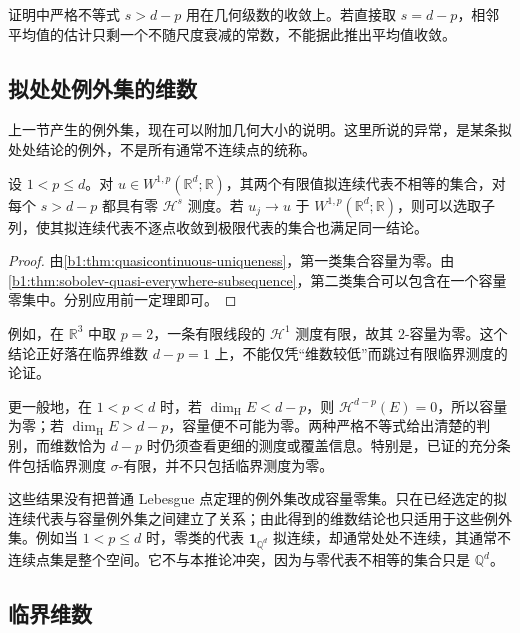 证明中严格不等式 \(s>d-p\) 用在几何级数的收敛上。若直接取 \(s=d-p\)，相邻平均值的估计只剩一个不随尺度衰减的常数，不能据此推出平均值收敛。

\subsection{拟处处例外集的维数}
\label{b1:subsec:260303}

上一节产生的例外集，现在可以附加几何大小的说明。这里所说的异常，是某条拟处处结论的例外，不是所有通常不连续点的统称。

\begin{corollary}\label{b1:cor:capacity-exception-dimension}
设 \(1<p\leq d\)。对 \(u\in W^{1,p}(\mathbb R^d;\mathbb R)\)，其两个有限值拟连续代表不相等的集合，对每个 \(s>d-p\) 都具有零 \(\mathcal H^s\) 测度。若 \(u_j\to u\) 于 \(W^{1,p}(\mathbb R^d;\mathbb R)\)，则可以选取子列，使其拟连续代表不逐点收敛到极限代表的集合也满足同一结论。
\end{corollary}
\begin{proof}
由\cref{b1:thm:quasicontinuous-uniqueness}，第一类集合容量为零。由\cref{b1:thm:sobolev-quasi-everywhere-subsequence}，第二类集合可以包含在一个容量零集中。分别应用前一定理即可。
\end{proof}

例如，在 \(\mathbb R^3\) 中取 \(p=2\)，一条有限线段的
\(\mathcal H^1\) 测度有限，故其 \(2\)-容量为零。这个结论正好落在临界维数 \(d-p=1\) 上，不能仅凭“维数较低”而跳过有限临界测度的论证。

\ProseParagraphBreak

更一般地，在 \(1<p<d\) 时，若
\(\dim_{\mathrm H}E<d-p\)，则 \(\mathcal H^{d-p}(E)=0\)，所以容量为零；若
\(\dim_{\mathrm H}E>d-p\)，容量便不可能为零。两种严格不等式给出清楚的判别，而维数恰为 \(d-p\) 时仍须查看更细的测度或覆盖信息。特别是，已证的充分条件包括临界测度 \(\sigma\)-有限，并不只包括临界测度为零。

\ProseParagraphBreak

这些结果没有把普通 Lebesgue 点定理的例外集改成容量零集。只在已经选定的拟连续代表与容量例外集之间建立了关系；由此得到的维数结论也只适用于这些例外集。例如当 \(1<p\leq d\) 时，零类的代表 \(\mathbf1_{\mathbb Q^d}\) 拟连续，却通常处处不连续，其通常不连续点集是整个空间。它不与本推论冲突，因为与零代表不相等的集合只是 \(\mathbb Q^d\)。

\subsection{临界维数}
\label{b1:subsec:260304}

